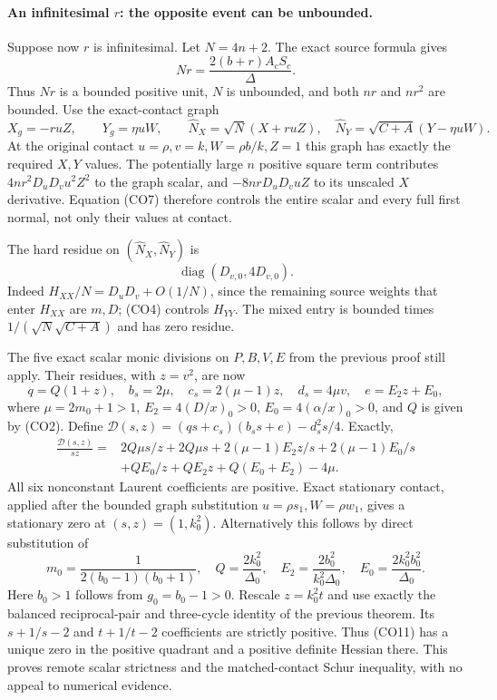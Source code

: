 \paragraph{An infinitesimal $r$: the opposite event can be unbounded.}
Suppose now $r$ is infinitesimal.  Let $N=4n+2$.  The exact source
formula gives
\[
             Nr=\frac{2(b+r)A_cS_c}{\Delta}.             \tag{CO7}
\]
Thus $Nr$ is a bounded positive unit, $N$ is unbounded, and both
$nr$ and $nr^2$ are bounded.  Use the exact-contact graph
\[
 X_g=-ruZ,\qquad Y_g=\eta uW,
 \qquad
 \widehat N_X=\sqrt N(X+ruZ),\quad
 \widehat N_Y=\sqrt{C+A}(Y-\eta uW).                    \tag{CO8}
\]
At the original contact $u=\rho,v=k,W=\rho b/k,Z=1$ this graph
has exactly the required $X,Y$ values.  The potentially large $n$
positive square term contributes $4nr^2D_uD_vu^2Z^2$ to the graph scalar, and
$-8nrD_uD_vuZ$ to its unscaled $X$ derivative.  Equation (CO7)
therefore controls the entire scalar and every full first normal,
not only their values at contact.

The hard residue on $(\widehat N_X,\widehat N_Y)$ is
\[
                  \operatorname{diag}(D_{v,0},4D_{v,0}). \tag{CO9}
\]
Indeed $H_{XX}/N=D_uD_v+O(1/N)$, since the remaining source
weights that enter $H_{XX}$ are $m,D$; (CO4) controls $H_{YY}$.
The mixed entry is bounded times
$1/(\sqrt N\sqrt{C+A})$ and has zero residue.

The five exact scalar monic divisions on $P,B,V,E$ from the previous
proof still apply.  Their residues, with $z=v^2$, are now
\[
 q=Q(1+z),\quad b_s=2\mu,\quad c_s=2(\mu-1)z,
 \quad d_s=4\mu v,\quad e=E_2z+E_0,                    \tag{CO10}
\]
where $\mu=2m_0+1>1$, $E_2=4(D/x)_0>0$,
$E_0=4(\alpha/x)_0>0$, and $Q$ is given by (CO2).
Define
$\mathcal D(s,z)=(qs+c_s)(b_ss+e)-d_s^2s/4$.
Exactly,
\begin{align*}
 \frac{\mathcal D(s,z)}{sz}={}&
 2Q\mu s/z+2Q\mu s
 +2(\mu-1)E_2z/s+2(\mu-1)E_0/s\\
 &+QE_0/z+QE_2z+Q(E_0+E_2)-4\mu.                    \tag{CO11}
\end{align*}
All six nonconstant Laurent coefficients are positive.  Exact
stationary contact, applied after the bounded graph substitution
$u=\rho s_1,W=\rho w_1$, gives a stationary zero at
$(s,z)=(1,k_0^2)$.  Alternatively this follows by direct substitution
of
\[
 m_0=\frac1{2(b_0-1)(b_0+1)},\quad
 Q=\frac{2k_0^2}{\Delta_0},\quad
 E_2=\frac{2b_0^2}{k_0^2\Delta_0},\quad
 E_0=\frac{2k_0^2b_0^2}{\Delta_0}.
\]
Here $b_0>1$ follows from $g_0=b_0-1>0$.
Rescale $z=k_0^2t$ and use exactly the balanced reciprocal-pair and
three-cycle identity of the previous theorem.  Its $s+1/s-2$ and
$t+1/t-2$ coefficients are strictly positive.  Thus (CO11) has a
unique zero in the positive quadrant and a positive definite Hessian
there.  This proves remote scalar strictness and the matched-contact
Schur inequality, with no appeal to numerical evidence.

